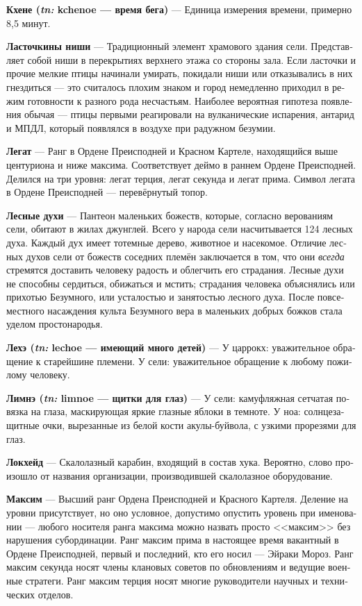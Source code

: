 \documentclass[a4paper,12pt,fleqn]{book}\usepackage{polyglossia}\setdefaultlanguage[babelshorthands=true]{russian}\setotherlanguage{english}\defaultfontfeatures{Ligatures=TeX,Mapping=tex-text}\usepackage{xcolor}\newcommand{\ml}[3]{#2}
\newcommand{\theterm}[3]{\textbf{\hypertarget{#1}{#2}} --- #3}
\newcommand{\theorigin}[3]{\textit{#1:} #2 --- #3}
\begin{document}
{\theterm{kchenoe-time}
{Кхене (\theorigin{tn}{kchenoe}{время бега})}
{Единица измерения времени, примерно 8,5 минут.}

\theterm{swallow-niche} %
{Ласточкины ниши}
{Традиционный элемент храмового здания сели.
Представляет собой ниши в перекрытиях верхнего этажа со стороны зала.
Если ласточки и прочие мелкие птицы начинали умирать, покидали ниши или отказывались в них гнездиться --- это считалось плохим знаком и город немедленно приходил в режим готовности к разного рода несчастьям.
Наиболее вероятная гипотеза появления обычая --- птицы первыми реагировали на вулканические испарения, антарид и МПДЛ, который появлялся в воздухе при радужном безумии.}

\theterm{legate} %
{Легат}
{Ранг в Ордене Преисподней и Красном Картеле, находящийся выше центуриона и ниже максима.
Соответствует деймо в раннем Ордене Преисподней.
Делился на три уровня: легат терция, легат секунда и легат прима.
Символ легата в Ордене Преисподней --- перевёрнутый топор.}

\theterm{silva-spirits}
{Лесные духи}
{Пантеон маленьких божеств, которые, согласно верованиям сели, обитают в жилах джунглей.
Всего у народа сели насчитывается 124 лесных духа.
Каждый дух имеет тотемные дерево, животное и насекомое.
Отличие лесных духов сели от божеств соседних племён заключается в том, что они \emph{всегда} стремятся доставить человеку радость и облегчить его страдания.
Лесные духи не способны сердиться, обижаться и мстить;
страдания человека объяснялись или прихотью Безумного, или усталостью и занятостью лесного духа.
После повсеместного насаждения культа Безумного вера в маленьких добрых божков стала уделом простонародья.}

\theterm{lechoe}
{Лехэ (\theorigin{tn}{lechoe}{имеющий много детей})}
{У царрокх: уважительное обращение к старейшине племени.
У сели: уважительное обращение к любому пожилому человеку.}

\theterm{limnoe}
{Лимнэ (\theorigin{tn}{limnoe}{щитки для глаз})}
{У сели: камуфляжная сетчатая повязка на глаза, маскирующая яркие глазные яблоки в темноте.
У ноа: солнцезащитные очки, вырезанные из белой кости акулы-буйвола, с узкими прорезями для глаз.}

\theterm{lockheed}
{Локхейд}
{Скалолазный карабин, входящий в состав хука.
Вероятно, слово произошло от названия организации, производившей скалолазное оборудование.}

\theterm{maccsim} %
{Максим}
{Высший ранг Ордена Преисподней и Красного Картеля.
Деление на уровни присутствует, но оно условное, допустимо опустить уровень при именовании --- любого носителя ранга максима можно назвать просто <<максим>> без нарушения субординации.
Ранг максим прима в настоящее время вакантный в Ордене Преисподней, первый и последний, кто его носил --- Эйраки Мороз.
Ранг максим секунда носят члены клановых советов по обновлениям и ведущие военные стратеги.
Ранг максим терция носят многие руководители научных и технических отделов.}

}
\end{document}

